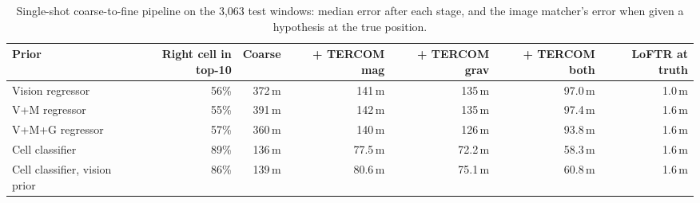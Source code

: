 \begin{table}[t]
\centering
\small
\caption{Single-shot coarse-to-fine pipeline on the 3{,}063 test windows: median error after each stage, and the image matcher's error when given a hypothesis at the true position.}
\label{tab:c2fstages}
\begin{adjustbox}{max width=\linewidth}
\begin{tabular}{lrrrrrr}
\toprule
Prior & Right cell in top-10 & Coarse & + TERCOM mag & + TERCOM grav & + TERCOM both & LoFTR at truth \\
\midrule
Vision regressor & 56\% & 372\,m & 141\,m & 135\,m & 97.0\,m & 1.0\,m \\
V+M regressor & 55\% & 391\,m & 142\,m & 135\,m & 97.4\,m & 1.6\,m \\
V+M+G regressor & 57\% & 360\,m & 140\,m & 126\,m & 93.8\,m & 1.6\,m \\
Cell classifier & 89\% & 136\,m & 77.5\,m & 72.2\,m & 58.3\,m & 1.6\,m \\
Cell classifier, vision prior & 86\% & 139\,m & 80.6\,m & 75.1\,m & 60.8\,m & 1.6\,m \\
\bottomrule
\end{tabular}
\end{adjustbox}
\end{table}
